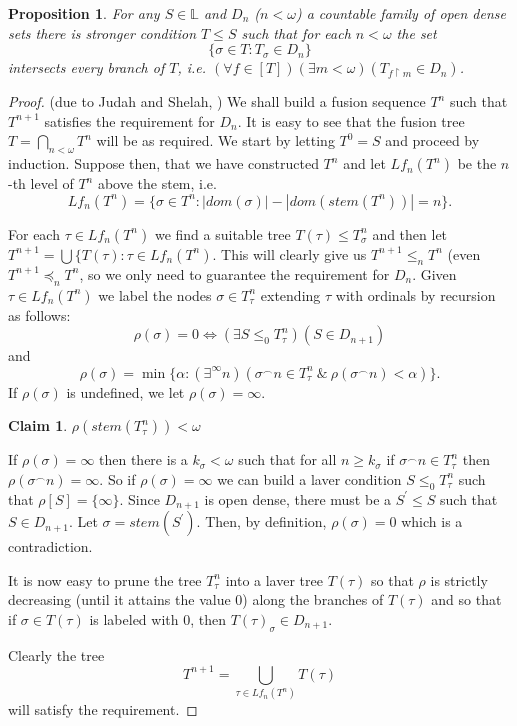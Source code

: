 \documentclass[a4paper,11pt,oneside]{mybook}
\def\conc{{^\smallfrown}}
\theoremstyle{theorem}
\newtheorem{proposition}[subsection]{Proposition}
\newtheorem{claim}[subsection]{Claim}
\theoremstyle{example}
\begin{document}
\begin{proposition} For any $S\in\mathbb{L}$ and $D_n$ ($n<\omega$) a countable family of open dense sets
there is stronger condition $T\leq S$ such that for each $n<\omega$ the set
$$\{\sigma\in T:T_\sigma\in D_n\}$$
intersects every branch of $T$, i.e. $(\forall f\in [T])(\exists m<\omega)(T_{f\upharpoonright m}\in D_n)$.
\end{proposition}
\begin{proof} (due to Judah and Shelah, \cite{judah-shelah}) We shall build a fusion sequence $T^n$ such that $T^{n+1}$ satisfies the requirement for $D_n$. It is easy
to see that the fusion tree $T=\bigcap_{n<\omega}T^n$ will be as required. We start by letting $T^0=S$ and proceed by
induction. Suppose then, that we have constructed $T^n$ and let $Lf_n(T^n)$ be the $n$-th level of $T^n$ above the stem,
i.e.
$$Lf_n(T^n) = \{\sigma\in T^n:|dom(\sigma)|-|dom(stem(T^n))|=n\}.$$

For each $\tau\in Lf_n(T^n)$ we find a suitable tree $T(\tau)\leq T^n_\sigma$ and then let $T^{n+1}=\bigcup \{T(\tau):\tau\in Lf_n(T^n)$.
This will clearly give us $T^{n+1}\leq_n T^n$ (even $T^{n+1}\preceq_n T^n$, so we only need to guarantee the requirement for $D_n$. Given $\tau\in Lf_n(T^n)$ we
label the nodes $\sigma\in T^n_\tau$ extending $\tau$ with ordinals by recursion as follows:
$$
\rho(\sigma)=0\iff(\exists S\leq_0 T^n_\tau)(S\in D_{n+1})
$$
and
$$
\rho(\sigma)=\min\{\alpha:(\exists^{\infty} n)(\sigma\conc n\in T^n_\tau\ \&\ \rho(\sigma\conc n)<\alpha)\}.
$$
If $\rho(\sigma)$ is undefined, we let $\rho(\sigma)=\infty$.

\begin{claim} $\rho(stem(T^n_\tau))<\omega$
\end{claim}
If $\rho(\sigma)=\infty$ then there is a $k_\sigma<\omega$ such that for all $n\geq k_\sigma$ if $\sigma\conc n\in T^n_\tau$ then $\rho(\sigma\conc n)=\infty$.
So if $\rho(\sigma)=\infty$ we can build a laver condition $S\leq_0 T^n_\tau$ such that $\rho[S]=\{\infty\}$. Since $D_{n+1}$ is open dense,
there must be a $S^\prime\leq S$ such that $S\in D_{n+1}$. Let $\sigma=stem(S^\prime)$. Then, by definition, $\rho(\sigma)=0$ which is a contradiction.

It is now easy to prune the tree $T^n_\tau$ into a laver tree $T(\tau)$  so that $\rho$ is strictly decreasing (until it attains the value $0$) along the branches of $T(\tau)$ and so that if $\sigma\in T(\tau)$ is labeled with $0$, then $T(\tau)_\sigma\in D_{n+1}$.

Clearly the tree
$$T^{n+1}=\bigcup_{\tau\in Lf_n(T^n)} T(\tau)$$
will satisfy the requirement.
\end{proof}
\end{document}
